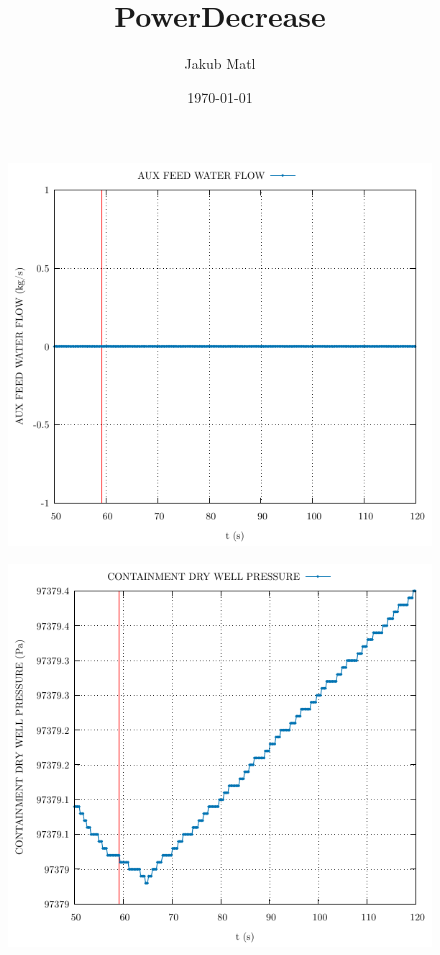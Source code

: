 \documentclass{article}
\title{PowerDecrease}
\author{Jakub Matl}
\date{\today}
\begin{document}
\maketitle
\begin{multicols}{2}
\begin{figure}[H]
\centering
\includegraphics[width=\linewidth]{./graphs/AUX FEED WATER FLOW_comp.pdf}
\end{figure}
\begin{figure}[H]
\centering
\includegraphics[width=\linewidth]{./graphs/CONTAINMENT DRY WELL PRESSURE_comp.pdf}

\end{figure}
\end{multicols}
\end{document}
